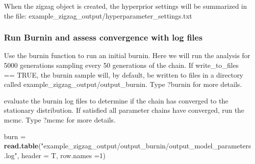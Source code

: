 \documentclass[]{article}
\newenvironment{Shaded}{\begin{snugshade}}{\end{snugshade}}
\newcommand{\KeywordTok}[1]{\textcolor[rgb]{0.13,0.29,0.53}{\textbf{{#1}}}}
\newcommand{\DataTypeTok}[1]{\textcolor[rgb]{0.13,0.29,0.53}{{#1}}}
\newcommand{\DecValTok}[1]{\textcolor[rgb]{0.00,0.00,0.81}{{#1}}}
\newcommand{\StringTok}[1]{\textcolor[rgb]{0.31,0.60,0.02}{{#1}}}
\newcommand{\OtherTok}[1]{\textcolor[rgb]{0.56,0.35,0.01}{{#1}}}
\newcommand{\NormalTok}[1]{{#1}}
\begin{document}
\begin{Shaded}
\end{Shaded}

When the zigzag object is created, the hyperprior settings will be
summarized in the file:
example\_zigzag\_output/hyperparameter\_settings.txt

\subsubsection{Run Burnin and assess convergence with log
files}\label{run-burnin-and-assess-convergence-with-log-files}

Use the burnin function to run an initial burnin. Here we will run the
analysis for 5000 generations sampling every 50 generations of the
chain. If write\_to\_files == TRUE, the burnin sample will, by default,
be written to files in a directory called
example\_zigzag\_output/output\_burnin. Type ?burnin for more details.

\begin{Shaded}
\end{Shaded}

evaluate the burnin log files to determine if the chain has converged to
the stationary distribution. If satisfied all parameter chains have
converged, run the mcmc. Type ?mcmc for more details.

\begin{Shaded}
\begin{Highlighting}[]
\NormalTok{burn =}\StringTok{ }\KeywordTok{read.table}\NormalTok{(}\StringTok{"example_zigzag_output/output_burnin/output_model_parameters.log"}\NormalTok{, }\DataTypeTok{header =} \NormalTok{T, }\DataTypeTok{row.names =}\DecValTok{1}\NormalTok{)}
\end{Highlighting}
\end{Shaded}
\end{document}
